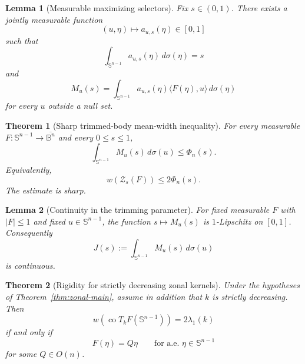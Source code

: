 \documentclass[10pt,a4paper]{amsart}
\newtheorem{theorem}{Theorem}
\newtheorem{lemma}{Lemma}
\begin{document}
\begin{lemma}[Measurable maximizing selectors]\label{lem:quantile-selector}
Fix $s\in(0,1)$.  There exists a jointly measurable function
\[
 (u,\eta)\longmapsto a_{u,s}(\eta)\in[0,1]
\]
such that
\[
 \int_{\mathbb S^{n-1}} a_{u,s}(\eta)\,d\sigma(\eta)=s
\]
and
\[
 M_u(s)
 =
 \int_{\mathbb S^{n-1}} a_{u,s}(\eta)\langle F(\eta),u\rangle\,d\sigma(\eta)
\]
for every $u$ outside a null set.
\end{lemma}

\begin{theorem}[Sharp trimmed-body mean-width inequality]\label{thm:trimmed}
For every measurable
$F:\mathbb S^{n-1}\to\overline{\mathbb B^n}$ and every $0\le s\le1$,
\begin{equation}\label{eq:trimmedbound}
 \int_{\mathbb S^{n-1}}M_u(s)\,d\sigma(u)\le \Phi_n(s).
\end{equation}
Equivalently,
\[
 w(\mathcal Z_s(F))\le 2\Phi_n(s).
\]
The estimate is sharp.
\end{theorem}

\begin{lemma}[Continuity in the trimming parameter]\label{lem:M-continuous}
For fixed measurable $F$ with $|F|\le1$ and fixed
$u\in\mathbb S^{n-1}$, the function $s\mapsto M_u(s)$ is
$1$-Lipschitz on $[0,1]$.  Consequently
\[
 J(s):=\int_{\mathbb S^{n-1}}M_u(s)\,d\sigma(u)
\]
is continuous.
\end{lemma}

\begin{theorem}[Rigidity for strictly decreasing zonal kernels]
\label{thm:zonal-rigidity}
Under the hypotheses of Theorem~\ref{thm:zonal-main}, assume in addition
that $k$ is strictly decreasing.  Then
\[
 w\!\left(
 \operatorname{co}T_kF(\mathbb S^{n-1})
 \right)
 =
 2\lambda_1(k)
\]
if and only if
\[
 F(\eta)=Q\eta
 \qquad\text{for a.e. }\eta\in\mathbb S^{n-1}
\]
for some $Q\in O(n)$.
\end{theorem}
\end{document}
